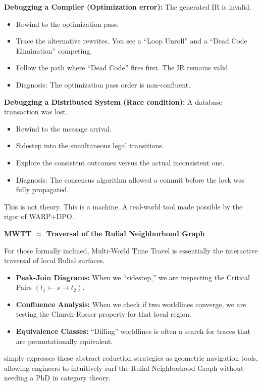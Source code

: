 \textbf{Debugging a Compiler (Optimization error):}
The generated IR is invalid.
\begin{itemize}
    \item Rewind to the optimization pass.
    \item Trace the alternative rewrites. You see a ``Loop Unroll'' and a ``Dead Code Elimination'' competing.
    \item Follow the path where ``Dead Code'' fires first. The IR remains valid.
    \item Diagnosis: The optimization pass order is non-confluent.
\end{itemize}

\textbf{Debugging a Distributed System (Race condition):}
A database transaction was lost.
\begin{itemize}
    \item Rewind to the message arrival.
    \item Sidestep into the simultaneous legal transitions.
    \item Explore the consistent outcomes versus the actual inconsistent one.
    \item Diagnosis: The consensus algorithm allowed a commit before the lock was fully propagated.
\end{itemize}

This is not theory. This is a machine. A real-world tool made possible by the rigor of WARP+DPO.

\begin{nerdbox}
\textbf{MWTT $\approx$ Traversal of the Rulial Neighborhood Graph}

For those formally inclined, Multi-World Time Travel is essentially the interactive traversal of local Rulial surfaces.

\begin{itemize}
    \item \textbf{Peak-Join Diagrams:} When we ``sidestep,'' we are inspecting the Critical Pairs $(t_1 \leftarrow s \to t_2)$.
    \item \textbf{Confluence Analysis:} When we check if two worldlines converge, we are testing the Church-Rosser property for that local region.
    \item \textbf{Equivalence Classes:} ``Diffing'' worldlines is often a search for traces that are permutationally equivalent.
\end{itemize}

\COMPUTER{} simply expresses these abstract reduction strategies as geometric navigation tools, allowing engineers to intuitively surf the Rulial Neighborhood Graph without needing a PhD in category theory.
\end{nerdbox}

